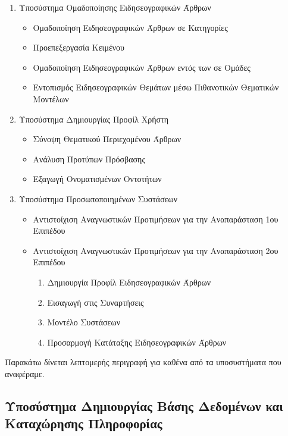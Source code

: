 {\begin{enumerate}
  \item Υποσύστημα Ομαδοποίησης Ειδησεογραφικών Άρθρων
    \begin{itemize}
    \item{Ομαδοποίηση Ειδησεογραφικών Άρθρων σε Κατηγορίες {}}
    \item{Προεπεξεργασία Κειμένου {}}
    \item{Ομαδοποίηση Ειδησεογραφικών Άρθρων εντός των {} σε Ομάδες {}}
    \item{Εντοπισμός Ειδησεογραφικών Θεμάτων μέσω Πιθανοτικών Θεματικών Μοντέλων}
  \end{itemize}
  
  \item Υποσύστημα Δημιουργίας Προφίλ Χρήστη
    \begin{itemize}
      \item Σύνοψη Θεματικού Περιεχομένου Άρθρων
      \item Ανάλυση Προτύπων Πρόσβασης
      \item Εξαγωγή Ονοματισμένων Οντοτήτων
    \end{itemize}

  \item Υποσύστημα Προσωποποιημένων Συστάσεων
    \begin{itemize}
     \item Αντιστοίχιση Αναγνωστικών Προτιμήσεων για την Αναπαράσταση 1ου Επιπέδου
     \item Αντιστοίχιση Αναγνωστικών Προτιμήσεων για την Αναπαράσταση 2ου Επιπέδου
     \begin{enumerate}
      \item Δημιουργία Προφίλ Ειδησεογραφικών Άρθρων
      \item Εισαγωγή στις {} Συναρτήσεις
      \item Μοντέλο Συστάσεων
      \item Προσαρμογή Κατάταξης Ειδησεογραφικών Άρθρων
      \end{enumerate}
    \end{itemize}

\end{enumerate}

Παρακάτω δίνεται λεπτομερής περιγραφή για καθένα από τα υποσυστήματα που αναφέραμε.

\subsection{Υποσύστημα Δημιουργίας Βάσης Δεδομένων και Καταχώρησης Πληροφορίας}

}
